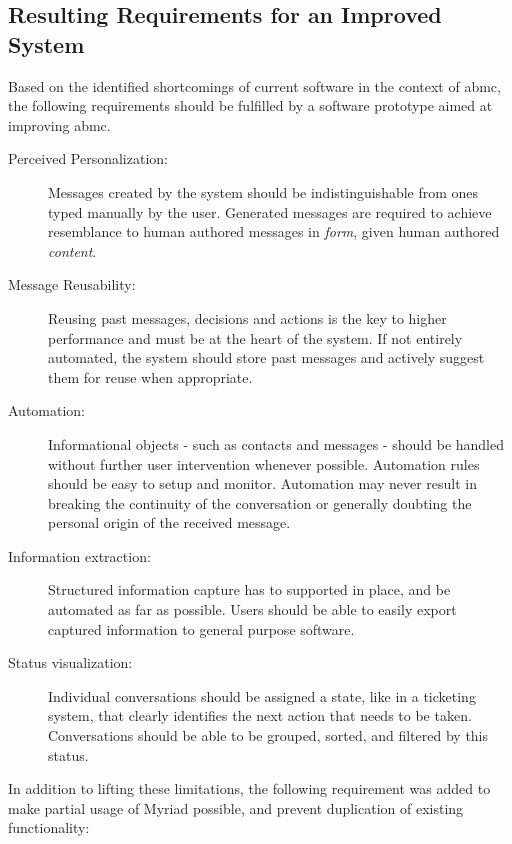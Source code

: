 \subsection{Resulting Requirements for an Improved System}

Based on the identified shortcomings of current software in the context of \gls{abmc}, the following requirements should be fulfilled by a software prototype aimed at improving \gls{abmc}.

\begin{description}

\item[Perceived Personalization:] Messages created by the system should be indistinguishable from ones typed manually by the user. Generated messages are required to achieve resemblance to human authored messages in \emph{form}, given human authored \emph{content}.

\item[Message Reusability:] Reusing past messages, decisions and actions is the key to higher performance and must be at the heart of the system. If not entirely automated, the system should store past messages and actively suggest them for reuse when appropriate.

\item[Automation:] Informational objects - such as contacts and messages - should be handled without further user intervention whenever possible. Automation rules should be easy to setup and monitor. Automation may never result in breaking the continuity of the conversation or generally doubting the personal origin of the received message.

\item[Information extraction:] Structured information capture has to supported in place, and be automated as far as possible. Users should be able to easily export captured information to general purpose software.

\item[Status visualization:] Individual conversations should be assigned a state, like in a ticketing system, that clearly identifies the next action that needs to be taken. Conversations should be able to be grouped, sorted, and filtered by this status.

\end{description}

In addition to lifting these limitations, the following requirement was added to make partial usage of Myriad possible, and prevent duplication of existing functionality:

